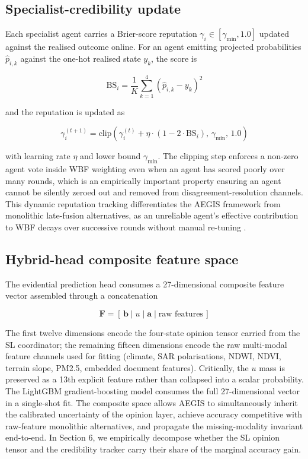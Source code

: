 \subsection{Specialist-credibility update}

Each specialist agent carries a Brier-score reputation $\gamma_i \in [\gamma_{\min}, 1.0]$ updated against the realised outcome online. For an agent emitting projected probabilities $\hat{p}_{i,k}$ against the one-hot realised state $y_k$, the score is

\begin{equation}
\text{BS}_i = \frac{1}{K} \sum_{k=1}^{4} \left(\hat{p}_{i,k} - y_k\right)^2
\label{eq:brier_score}
\end{equation}

and the reputation is updated as

\begin{equation}
\gamma_i^{(t+1)} = \text{clip}\left(\gamma_i^{(t)} + \eta \cdot (1 - 2 \cdot \text{BS}_i), \, \gamma_{\min}, \, 1.0\right)
\label{eq:credibility_update}
\end{equation}

with learning rate $\eta$ and lower bound $\gamma_{\min}$. The clipping step enforces a non-zero agent vote inside WBF weighting even when an agent has scored poorly over many rounds, which is an empirically important property ensuring an agent cannot be silently zeroed out and removed from disagreement-resolution channels. This dynamic reputation tracking differentiates the AEGIS framework from monolithic late-fusion alternatives, as an unreliable agent's effective contribution to WBF decays over successive rounds without manual re-tuning \citep{wang2007formal}.

\subsection{Hybrid-head composite feature space}

The evidential prediction head consumes a 27-dimensional composite feature vector assembled through a concatenation

\begin{equation}
\mathbf{F} = \left[ \, \mathbf{b} \mid u \mid \mathbf{a} \mid \text{raw features} \, \right]
\label{eq:hybrid_feature_vector}
\end{equation}

The first twelve dimensions encode the four-state opinion tensor carried from the SL coordinator; the remaining fifteen dimensions encode the raw multi-modal feature channels used for fitting (climate, SAR polarisations, NDWI, NDVI, terrain slope, PM2.5, embedded document features). Critically, the $u$ mass is preserved as a 13th explicit feature rather than collapsed into a scalar probability. The LightGBM gradient-boosting model consumes the full 27-dimensional vector in a single-shot fit. The composite space allows AEGIS to simultaneously inherit the calibrated uncertainty of the opinion layer, achieve accuracy competitive with raw-feature monolithic alternatives, and propagate the missing-modality invariant end-to-end. In Section 6, we empirically decompose whether the SL opinion tensor and the credibility tracker carry their share of the marginal accuracy gain.
